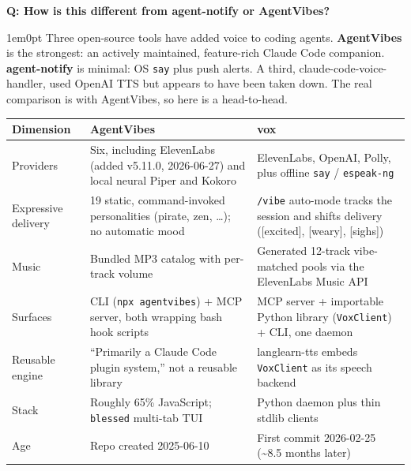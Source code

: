 \documentclass[11pt,letterpaper]{article}
\newcounter{faqnum}
\newenvironment{faqpair}[1]{%
  \needspace{4\baselineskip}%
  \vspace{0.5em}%
  \refstepcounter{faqnum}%
  \noindent\textbf{\color{SectionBlue}Q\thefaqnum: #1}\par\nopagebreak[4]%
  \vspace{0.2em}%
  \begin{adjustwidth}{1em}{0pt}%
  \setlength{\parindent}{0pt}%
}{%
  \end{adjustwidth}%
  \vspace{0.5em}%
}
\begin{document}
\begin{faqpair}{How is this different from agent-notify or AgentVibes?}\label{faq:competitors}
  Three open-source tools have added voice to coding agents. \textbf{AgentVibes}
  \cite{agentvibes2025} is the strongest: an actively maintained, feature-rich
  Claude Code companion. \textbf{agent-notify} \cite{agentnotify2025} is minimal:
  OS \texttt{say} plus push alerts. A third, claude-code-voice-handler, used
  OpenAI TTS but appears to have been taken down. The real comparison is with
  AgentVibes, so here is a head-to-head.

  \begin{center}
  \small
  \renewcommand{\arraystretch}{1.3}
  \begin{tabularx}{\linewidth}{@{} l X X @{}}
  \toprule
  \textbf{\color{SectionBlue}Dimension} & \textbf{\color{SectionBlue}AgentVibes} & \textbf{\color{SectionBlue}vox} \\
  \midrule
  Providers &
    Six, including ElevenLabs (added v5.11.0, 2026-06-27) and local neural
    Piper and Kokoro \cite{agentvibes2026releasenotes,agentvibes2026providers} &
    ElevenLabs, OpenAI, Polly, plus offline \texttt{say} / \texttt{espeak-ng} \\
  Expressive delivery &
    19 static, command-invoked personalities (pirate, zen, \dots); no automatic
    mood \cite{agentvibes2026personalities} &
    \texttt{/vibe} auto-mode tracks the session and shifts delivery
    ([excited], [weary], [sighs]) \\
  Music &
    Bundled MP3 catalog with per-track volume &
    Generated 12-track vibe-matched pools via the ElevenLabs Music API \\
  Surfaces &
    CLI (\texttt{npx agentvibes}) + MCP server, both wrapping bash hook scripts
    \cite{agentvibes2026technicaldeepdive} &
    MCP server + importable Python library (\texttt{VoxClient}) + CLI, one daemon \\
  Reusable engine &
    ``Primarily a Claude Code plugin system,'' not a reusable library
    \cite{agentvibes2026technicaldeepdive} &
    langlearn-tts embeds \texttt{VoxClient} as its speech backend \\
  Stack &
    Roughly 65\% JavaScript; \texttt{blessed} multi-tab TUI
    \cite{agentvibes2026github} &
    Python daemon plus thin stdlib clients \\
  Age &
    Repo created 2025-06-10 \cite{agentvibes2026github} &
    First commit 2026-02-25 (\textasciitilde{}8.5 months later) \\
  \bottomrule
  \end{tabularx}
  \renewcommand{\arraystretch}{1.0}
  \end{center}


\end{faqpair}
\end{document}
